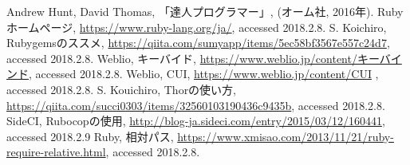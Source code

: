 \begin{thebibliography}{9}
 Andrew Hunt, David Thomas, 「達人プログラマー」, (オーム社, 2016年).
 Ruby ホームページ, \url{https://www.ruby-lang.org/ja/}, accessed 2018.2.8.
 S. Koichiro, Rubygemsのススメ, \url{https://qiita.com/sumyapp/items/5ec58bf3567e557c24d7}, accessed 2018.2.8.
 Weblio, キーバイド, \url{https://www.weblio.jp/content/キーバインド}, accessed 2018.2.8.
 Weblio, CUI, \url{https://www.weblio.jp/content/CUI} , accessed 2018.2.8.
 S. Kouichiro, Thorの使い方, \url{https://qiita.com/succi0303/items/32560103190436c9435b}, accessed 2018.2.8.
 SideCI, Rubocopの使用, \url{http://blog-ja.sideci.com/entry/2015/03/12/160441}, accessed 2018.2.9
 Ruby, 相対パス, \url{https://www.xmisao.com/2013/11/21/ruby-require-relative.html}, accessed 2018.2.8.
\end{thebibliography} 